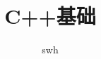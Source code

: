 \documentclass[12pt,twiside,a4paper]{ctexbook}
\numberwithin{chapter}{part}
\begin{document}

\author
{
swh
}


\title{C++基础}
\maketitle
\tableofcontents %
\newpage
\pagestyle{fancy}
\end{document}
